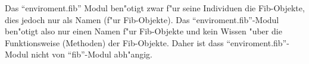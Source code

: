 Das ``enviroment.fib'' Modul ben"otigt zwar f"ur seine Individuen die Fib-Objekte, dies jedoch nur als Namen (f"ur Fib-Objekte). Das ``enviroment.fib''-Modul ben"otigt also nur einen Namen f"ur Fib-Objekte und kein Wissen "uber die Funktionsweise (Methoden) der Fib-Objekte. Daher ist dass ``enviroment.fib''-Modul nicht von ``fib''-Modul abh"angig.
















